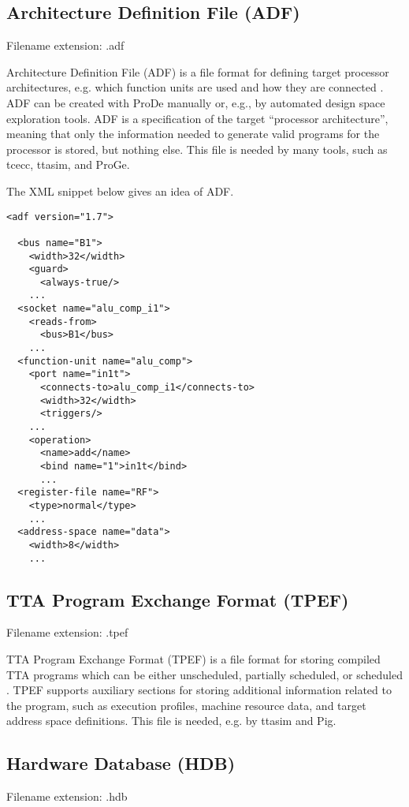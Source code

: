 \documentclass[twoside]{tceusermanual}
\begin{document}
\subsection{Architecture Definition File (ADF)}
\label{sec:adf}

Filename extension: .adf

Architecture Definition File (ADF) is a file format for
defining target processor architectures, e.g. which function units are
used and how they are connected \cite{ADF-specs}.  ADF can be created with
ProDe manually or, e.g., by automated design space exploration tools. ADF 
is a specification of the target ``processor architecture'', meaning that only 
the information needed to generate valid programs for the processor is stored, 
but nothing else. This file is needed by many tools, such as tcecc, ttasim, and ProGe.

The XML snippet below gives an idea of ADF.
\begin{verbatim}
<adf version="1.7">

  <bus name="B1">
    <width>32</width>
    <guard>
      <always-true/>
    ...
  <socket name="alu_comp_i1">
    <reads-from>
      <bus>B1</bus>
    ...
  <function-unit name="alu_comp">
    <port name="in1t">
      <connects-to>alu_comp_i1</connects-to>
      <width>32</width>
      <triggers/>
    ...
    <operation>
      <name>add</name>
      <bind name="1">in1t</bind>
      ...
  <register-file name="RF">
    <type>normal</type>
    ...
  <address-space name="data">
    <width>8</width>
    ...
\end{verbatim}

\subsection{TTA Program Exchange Format (TPEF)}
\label{section:TPEF}

Filename extension: .tpef

TTA Program Exchange Format (TPEF) is a file format for storing
compiled TTA programs which can be either unscheduled, partially
scheduled, or scheduled
\cite{TPEF-specs}. TPEF supports auxiliary sections for storing
additional information related to the program, such as execution
profiles, machine resource data, and target address space definitions.
This file is needed, e.g.  by ttasim and Pig.

\subsection{Hardware Database (HDB)}
\label{section:hdb}
Filename extension: .hdb
\end{document}
